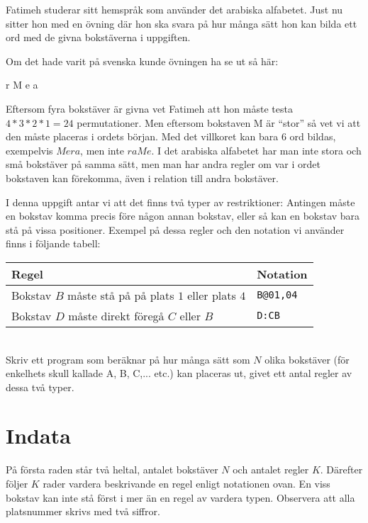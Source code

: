 
Fatimeh studerar sitt hemspråk som använder det arabiska alfabetet. Just nu
sitter hon med en övning där hon ska svara på
hur många sätt hon kan bilda ett ord med de givna bokstäverna i uppgiften.

Om det hade varit på svenska kunde övningen ha se ut så här:

\vspace{0.2in}
\centerline{r M e a}
\vspace{0.2in}

Eftersom fyra bokstäver är givna vet Fatimeh att hon måste testa $4*3*2*1 =
24$ permutationer. Men eftersom bokstaven M är ``stor'' så vet vi
att den måste placeras i ordets början. Med det villkoret kan bara $6$
ord bildas, exempelvis $Mera$, men
inte $raMe$. I det arabiska alfabetet har man inte stora och små bokstäver
på samma sätt, men man har andra regler om var
i ordet bokstaven kan förekomma, även i relation till andra
bokstäver. 

I denna uppgift antar vi att det finns två typer av restriktioner: Antingen måste en bokstav komma precis före
någon annan bokstav, eller så kan en bokstav bara stå på vissa
positioner. Exempel på dessa regler och den notation vi använder finns
i följande tabell:\\

\begin{tabular}{|l|l|} \hline
\textbf{Regel} & \textbf{Notation} \\ \hline
Bokstav $B$ måste stå på på plats $1$ eller plats $4$ & \texttt{B@01,04}
\\ \hline
Bokstav $D$ måste direkt föregå $C$ eller $B$  & \texttt{D:CB} \\ \hline
\end{tabular}\\

Skriv ett program som beräknar
på hur många sätt som $N$ olika bokstäver (för enkelhets skull kallade A,
B, C,... etc.) kan placeras ut, givet ett antal regler av dessa två
typer. 

\section*{Indata}

På första raden står två heltal, antalet bokstäver $N$
och antalet regler $K$. Därefter följer $K$ rader vardera beskrivande
en regel enligt notationen ovan. En viss bokstav kan inte stå först i mer än en regel av vardera typen. Observera att alla platsnummer skrivs med två siffror.

